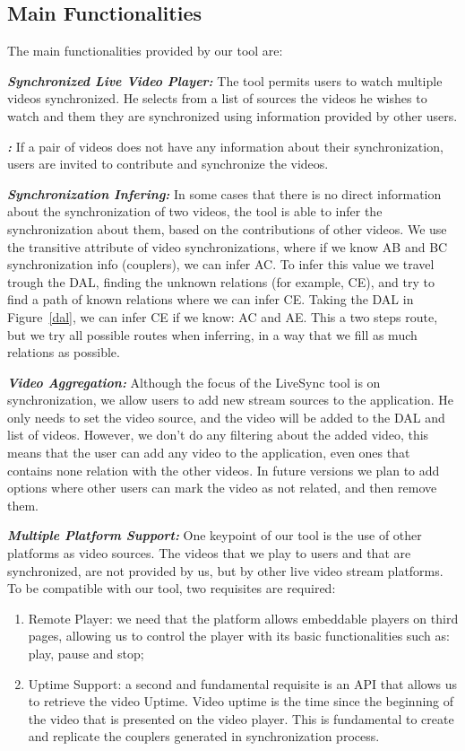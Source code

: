 \documentclass{sig-alternate-05-2015}
\begin{document}
\subsection{Main Functionalities}
	The main functionalities provided by our tool are:

\textbf{\textit{Synchronized Live Video Player:}} The tool permits users to watch multiple videos synchronized. He selects from a list of sources the videos he wishes to watch and them they are synchronized using information provided by other users.

\textbf{\textit{:}} If a pair of videos does not have any information about their synchronization, users are invited to contribute and synchronize the videos.

\textbf{\textit{Synchronization Infering:}}	
	In some cases that there is no direct information about the synchronization of two videos, the tool is able to infer the synchronization about them, based on the contributions of other videos. We use the transitive attribute of video synchronizations, where if we know AB and BC synchronization info (couplers), we can infer AC. To infer this value we travel trough the DAL, finding the unknown relations (for example, CE), and try to find a path of known relations where we can infer CE. Taking the DAL in Figure~\ref{dal}, we can infer CE if we know: AC and AE. This a two steps route, but we try all possible routes when inferring, in a way that we fill as much relations as possible.
	
\textbf{\textit{Video Aggregation:}} Although the focus of the LiveSync tool is on synchronization, we allow users to add new stream sources to the application. He only needs to set the video source, and the video will be added to the DAL and list of videos. However, we don't do any filtering about the added video, this means that the user can add any video to the application, even ones that contains none relation with the other videos. In future versions we plan to add options where other users can mark the video as not related, and then remove them.
	
\textbf{\textit{Multiple Platform Support:}} One keypoint of our tool is the use of other platforms as video sources. The videos that we play to users and that are synchronized, are not provided by us, but by other live video stream platforms. To be compatible with our tool, two requisites are required:
	\begin{enumerate}
		\item Remote Player: we need that the platform allows embeddable players on third pages, allowing us to control the player with its basic functionalities such as: play, pause and stop;
		\item Uptime Support: a second and fundamental requisite is an API that allows us to retrieve the video Uptime. Video uptime is the time since the beginning of the video that is presented on the video player. This is fundamental to create and replicate the couplers generated in synchronization process.
	\end{enumerate}
\end{document}
